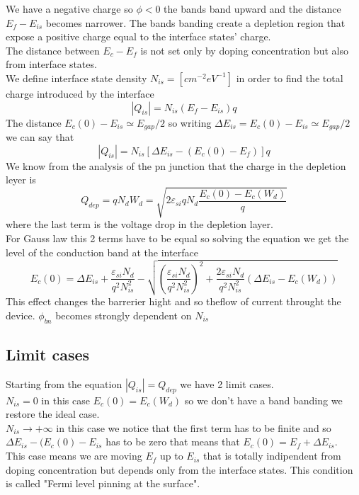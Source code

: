 We have a negative charge so $\phi<0$ the bands band upward and the distance $E_f-E_{is}$ becomes narrower. The bands banding create a depletion region that expose a positive charge equal to the interface states' charge.\\
The distance between $E_c-E_f$ is not set only by doping concentration but also from interface states.\\
We define interface state density $N_{is} = [cm^{-2}eV^{-1}]$ in order to find the total charge introduced by the interface 
\begin{equation}
|Q_{is}|=N_{is}(E_f-E_{is})q
\end{equation}
The distance $E_c(0)-E_{is}\simeq E_{gap}/2$ so writing $\Delta E_{is}=E_c(0)-E_{is}\simeq E_{gap}/2$ we can say that
\begin{equation}
|Q_{is}|=N_{is}[\Delta E_{is}-(E_c(0)-E_{f})]q
\end{equation}
We know from the analysis of the pn junction that the charge in the depletion leyer is 
\begin{equation}
Q_{dep}=qN_dW_d=\sqrt{2\varepsilon_{si}qN_d\frac{E_c(0)-E_c(W_d)}{q}}
\end{equation}
where the last term is the voltage drop in the depletion layer.\\
For Gauss law this 2 terms have to be equal so solving the equation we get the level of the conduction band at the interface 
\begin{equation}
E_c(0)=\Delta E_{is}+\frac{\varepsilon_{si}N_d}{q^2N^2_{is}}-\sqrt{(\frac{\varepsilon_{si}N_d}{q^2N^2_{is}})^2+\frac{2\varepsilon_{si}N_d}{q^2N^2_{is}}(\Delta E_{is}-E_c(W_d))}
\end{equation}
This effect changes the barrerier hight and so theflow of current throught the device. $\phi_{bn}$ becomes strongly dependent on $N_{is}$

\subsection{Limit cases}
Starting from the equation $|Q_{is}|=Q_{dep}$ we have 2 limit cases.\\
$N_{is}=0$ in this case $E_c(0)=E_c(W_d)$ so we don't have a band banding we restore the ideal case.\\
$N_{is}\rightarrow +\infty$ in this case we notice that the first term has to be finite and so $\Delta E_{is}-(E_c(0)-E_{is}$ has to be zero that means that $E_c(0)=E_f+\Delta E_{is}$. \\
This case means we are moving $E_{f}$ up to $E_{is}$ that is totally indipendent from doping concentration but depends only from the interface states. This condition is called "Fermi level pinning at the surface".\\


